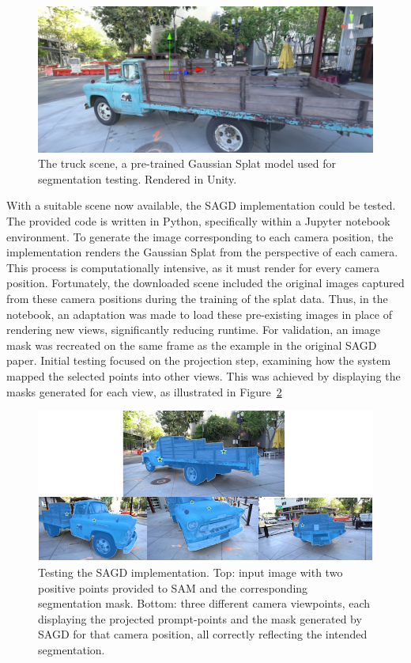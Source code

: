 \documentclass[12pt]{article}
\begin{document}
\begin{figure}[h!]
	\centering
	\includegraphics[width=\textwidth]{Images/truckscene.png}
	\caption{The truck scene, a pre-trained Gaussian Splat model used for segmentation testing. Rendered in Unity.}
	\label{fig:truck_scene}
\end{figure}
\FloatBarrier
\noindent
With a suitable scene now available, the SAGD implementation could be tested. The provided code is written in Python, specifically within a Jupyter notebook environment. To generate the image corresponding to each camera position, the implementation renders the Gaussian Splat from the perspective of each camera. This process is computationally intensive, as it must render for every camera position. Fortunately, the downloaded scene included the original images captured from these camera positions during the training of the splat data. Thus, in the notebook, an adaptation was made to load these pre-existing images in place of rendering new views, significantly reducing runtime. For validation, an image mask was recreated on the same frame as the example in the original SAGD paper. Initial testing focused on the projection step, examining how the system mapped the selected points into other views. This was achieved by displaying the masks generated for each view, as illustrated in Figure~\ref{fig:goodsagd} 
\begin{figure}[h!]
	\centering
	\includegraphics[width=\textwidth]{Images/goodsagd.png}
	\caption{Testing the SAGD implementation. Top: input image with two positive points provided to SAM and the corresponding segmentation mask. Bottom: three different camera viewpoints, each displaying the projected prompt-points and the mask generated by SAGD for that camera position, all correctly reflecting the intended segmentation.}
	\label{fig:goodsagd}
\end{figure}
\end{document}
